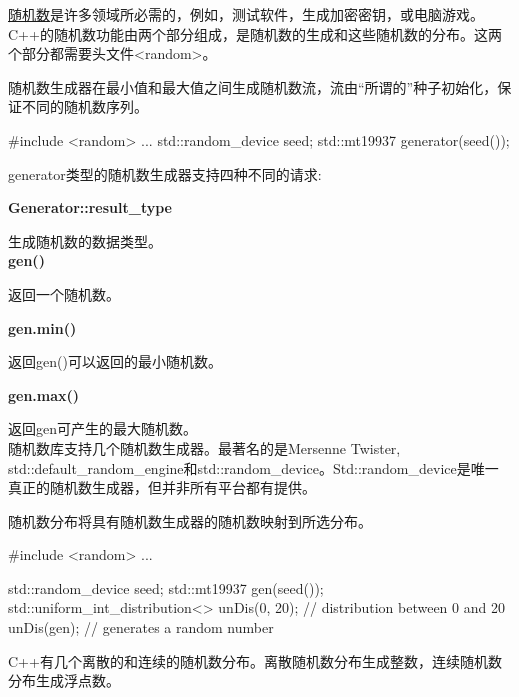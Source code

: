 \href{http://en.cppreference.com/w/cpp/header/random}{随机数}是许多领域所必需的，例如，测试软件，生成加密密钥，或电脑游戏。C++的随机数功能由两个部分组成，是随机数的生成和这些随机数的分布。这两个部分都需要头文件<random>。


随机数生成器在最小值和最大值之间生成随机数流，流由“所谓的”种子初始化，保证不同的随机数序列。

\begin{cpp}
#include <random>
...
std::random_device seed;
std::mt19937 generator(seed());
\end{cpp}

generator类型的随机数生成器支持四种不同的请求:

\noindent
\textbf{Generator::result\_type}

生成随机数的数据类型。\\

\noindent
\textbf{gen()}

返回一个随机数。

\noindent
\textbf{gen.min()}

返回gen()可以返回的最小随机数。

\noindent
\textbf{gen.max()}

返回gen可产生的最大随机数。 \\

随机数库支持几个随机数生成器。最著名的是Mersenne Twister, std::default\_random\_engine和std::random\_device。Std::random\_device是唯一真正的随机数生成器，但并非所有平台都有提供。


随机数分布将具有随机数生成器的随机数映射到所选分布。

\begin{cpp}
#include <random>
...

std::random_device seed;
std::mt19937 gen(seed());
std::uniform_int_distribution<> unDis(0, 20); // distribution between 0 and 20
unDis(gen); // generates a random number
\end{cpp}

C++有几个离散的和连续的随机数分布。离散随机数分布生成整数，连续随机数分布生成浮点数。

